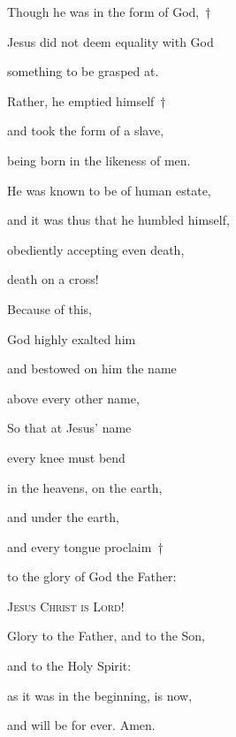 \noindent Though he was in the form of God,~†~\nopagebreak

Jesus did not deem equality with God~\GreStar{}~\nopagebreak

something to be grasped at.

\noindent Rather, he emptied himself~†~\nopagebreak

and took the form of a slave,~\GreStar{}~\nopagebreak

being born in the likeness of men.

\noindent He was known to be of human estate,~\GreStar{}~\nopagebreak

and it was thus that he humbled himself,

\noindent obediently accepting even death,~\GreStar{}~\nopagebreak

death on a cross!

\noindent Because of this,~\GreStar{}~\nopagebreak

God highly exalted him

\noindent and bestowed on him the name~\GreStar{}~\nopagebreak

above every other name,

\noindent So that at Jesus’ name~\GreStar{}~\nopagebreak

every knee must bend

\noindent in the heavens, on the earth,~\GreStar{}~\nopagebreak

and under the earth,

\noindent and every tongue proclaim~†~\nopagebreak

to the glory of God the Father:~\GreStar{}~\nopagebreak

\textsc{Jesus Christ is Lord!}

\noindent Glory to the Father, and to the Son,~\GreStar{}~\nopagebreak

and to the Holy Spirit:

\noindent as it was in the beginning, is now,~\GreStar{}~\nopagebreak

and will be for ever. Amen.
